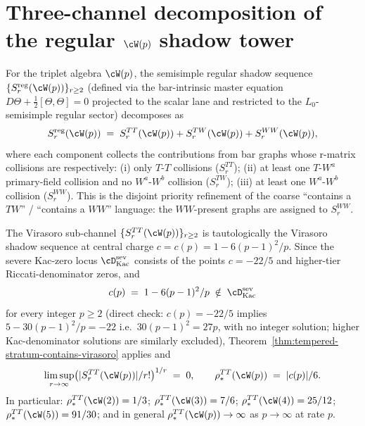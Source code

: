 \section{Three-channel decomposition of the regular $\cW(p)$ shadow tower}
\label{sec:wp-three-channel}

\begin{definition}
\label{def:wp-shadow-channel-decomposition}
For the triplet algebra $\cW(p)$, the semisimple regular shadow
sequence $\{S_r^{\mathrm{reg}}(\cW(p))\}_{r \ge 2}$ (defined via the
bar-intrinsic master equation
$D \Theta + \frac{1}{2}[\Theta, \Theta] = 0$ projected to the scalar
lane and restricted to the $L_0$-semisimple regular sector) decomposes
as
\[
 S_r^{\mathrm{reg}}(\cW(p)) \;=\;
 S_r^{TT}(\cW(p)) + S_r^{TW}(\cW(p)) + S_r^{WW}(\cW(p)),
\]
where each component collects the contributions from bar graphs whose
r-matrix collisions are respectively: (i) only $T$-$T$ collisions
($S_r^{TT}$); (ii) at least one $T$-$W^a$ primary-field collision and
no $W^a$-$W^b$ collision ($S_r^{TW}$); (iii) at least one
$W^a$-$W^b$ collision ($S_r^{WW}$). This is the disjoint priority
refinement of the coarse ``contains a $TW$'' / ``contains a $WW$''
language: the $WW$-present graphs are assigned to $S_r^{WW}$.
\end{definition}

\begin{lemma}
\label{lem:wp-virasoro-subchannel-tempered}
The Virasoro sub-channel $\{S_r^{TT}(\cW(p))\}_{r \ge 2}$ is
tautologically the Virasoro shadow sequence at central charge
$c = c(p) = 1 - 6(p-1)^2/p$. Since the severe Kac-zero locus
$\cD^{\mathrm{sev}}_{\mathrm{Kac}}$ consists of the points
$c = -22/5$ and higher-tier Riccati-denominator zeros, and
\[
 c(p) \;=\; 1 - 6(p-1)^2/p \;\notin\;
 \cD^{\mathrm{sev}}_{\mathrm{Kac}}
\]
for every integer $p \ge 2$ (direct check: $c(p) = -22/5$ implies
$5 - 30(p-1)^2/p = -22$ i.e.\ $30(p-1)^2 = 27 p$, with no integer
solution; higher Kac-denominator solutions are similarly excluded),
Theorem~\ref{thm:tempered-stratum-contains-virasoro} applies and
\[
 \limsup_{r \to \infty}
 \bigl( \lvert S_r^{TT}(\cW(p)) \rvert / r! \bigr)^{1/r} \;=\; 0,
 \qquad
 \rho_*^{TT}(\cW(p)) \;=\; \lvert c(p) \rvert / 6.
\]
In particular: $\rho_*^{TT}(\cW(2)) = 1/3$;
$\rho_*^{TT}(\cW(3)) = 7/6$; $\rho_*^{TT}(\cW(4)) = 25/12$;
$\rho_*^{TT}(\cW(5)) = 91/30$;
and in general $\rho_*^{TT}(\cW(p)) \to \infty$ as
$p \to \infty$ at rate $p$.
\end{lemma}

